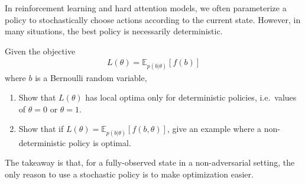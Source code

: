 \documentclass{harvardml}
\newcommand{\E}{\mathbb{E}}
\theoremstyle{plain}
\begin{document}







\begin{problem}

In reinforcement learning and hard attention models, we often parameterize a policy to stochastically choose actions according to the current state.
However, in many situations, the best policy is necessarily deterministic.

Given the objective
%
\begin{align}
L(\theta) = \E_{p(b|\theta)} \left[ f(b) \right]
\end{align}
%
where $b$ is a Bernoulli random variable,

\begin{enumerate}[label=(\alph*)]
\item Show that $L(\theta)$ has local optima only for deterministic policies, i.e.\ values of $\theta = 0$ or $\theta = 1$.

\item Show that if $L(\theta) = \E_{p(b|\theta)} \left[ f(b, \theta) \right]$, give an example where a non-deterministic policy is optimal.
\end{enumerate}

The takeaway is that, for a fully-observed state in a non-adversarial setting, the only reason to use a stochastic policy is to make optimization easier.
\end{problem}




\end{document}
